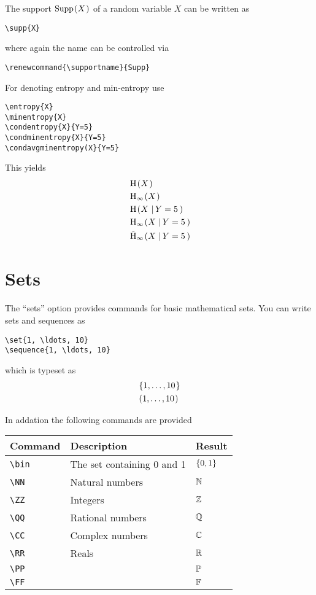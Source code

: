 \documentclass[a4paper]{report}
\begin{document}
The support $\supp{X}$ of a random variable $X$ can be written as
\begin{lstlisting}
\supp{X}
\end{lstlisting}
where again the name can be controlled via
\begin{lstlisting}
\renewcommand{\supportname}{Supp}
\end{lstlisting}

For denoting entropy and min-entropy use
\begin{lstlisting}
\entropy{X}
\minentropy{X}
\condentropy{X}{Y=5}
\condminentropy{X}{Y=5}
\condavgminentropy(X}{Y=5}
\end{lstlisting}
This yields
\begin{align*}
& \entropy{X} \\
& \minentropy{X} \\
& \condentropy{X}{Y=5} \\
& \condminentropy{X}{Y=5} \\
& \condavgminentropy{X}{Y=5}
\end{align*}

\section{Sets}
The \enquote{sets} option provides commands for basic mathematical sets.
You can write sets and sequences as
\begin{lstlisting}
\set{1, \ldots, 10}
\sequence{1, \ldots, 10}
\end{lstlisting}
which is typeset as
\begin{align*}
& \set{1, \ldots, 10} \\
& \sequence{1, \ldots, 10}
\end{align*}

In addation the following commands are provided
\begin{center}
\begin{tabular}{l l l}
\textbf{Command} & \textbf{Description} & \textbf{Result} \\\hline
\lstinline$\bin$ & The set containing 0 and 1 & $\{0,1\}$  \\
\lstinline$\NN$ & Natural numbers & $\mathbb{N}$  \\
\lstinline$\ZZ$ & Integers & $\mathbb{Z}$  \\
\lstinline$\QQ$ & Rational numbers & $\mathbb{Q}$  \\
\lstinline$\CC$ & Complex numbers & $\mathbb{C}$  \\
\lstinline$\RR$ & Reals & $\mathbb{R}$  \\
\lstinline$\PP$ & & $\mathbb{P}$  \\
\lstinline$\FF$ & & $\mathbb{F}$  \\
\end{tabular}
\end{center}
\end{document}

